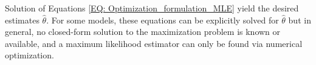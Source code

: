 \documentclass[../Article_Model_Parameters.tex]{subfiles}
\begin{document}
	\begin{table}[h]
		\caption{Constraints and initial guess}
		\label{tab:Constraints}
	\end{table}
		
	
	
	Solution of Equations \ref{EQ: Optimization_formulation_MLE} yield the desired estimates $\hat{\theta}$. For some models, these equations can be explicitly solved for $\hat{\theta}$ but in general, no closed-form solution to the maximization problem is known or available, and a maximum likelihood estimator can only be found via numerical optimization.
	
	
	
	
	
	
\end{document}
